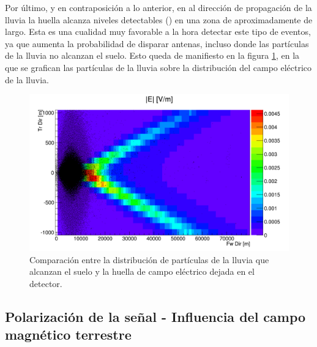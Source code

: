 	Por último, y en contraposición a lo anterior, en al dirección de propagación de la lluvia la huella alcanza niveles detectables () en una zona de aproximadamente  de largo.
	Esta es una cualidad muy favorable a la hora detectar este tipo de eventos, ya que aumenta la probabilidad de disparar antenas, incluso donde las part\'iculas de la lluvia no alcanzan el suelo.
	Esto queda de manifiesto en la figura \ref{fig:sim_foot_y_part}, en la que se grafican las part\'iculas de la lluvia sobre la distribuci\'on del campo el\'ectrico de la lluvia.
	\begin{figure}[ht!]
		\centering
		\includegraphics[width=\textwidth]{./fig/simulacionRadio/foorPrint_Test_18_89-5_90_25_1238_E_particles}
		\caption{\label{fig:sim_foot_y_part}
		Comparaci\'on entre la distribuci\'on de part\'iculas de la lluvia que alcanzan el suelo y la huella de campo el\'ectrico dejada en el detector.
		}
	\end{figure}
	
	\subsection{Polarización de la señal - Influencia del campo magn\'etico terrestre}
	
